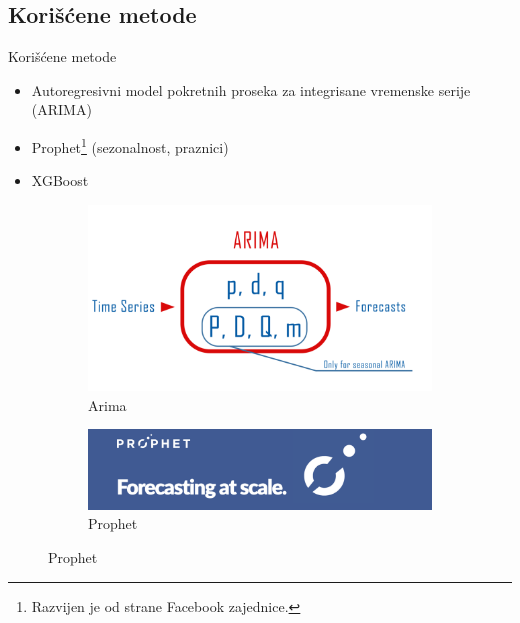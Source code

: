 \documentclass{beamer}
\begin{document}
\subsection{Korišćene metode}
\begin{frame}{Korišćene metode}
\begin{itemize}
    \item Autoregresivni model pokretnih proseka za integrisane vremenske serije (ARIMA)
    
    \item Prophet\footnote{Razvijen je od strane Facebook zajednice.} (sezonalnost, praznici)
    \item XGBoost
\end{itemize}

\begin{figure}[!tbp]
  \begin{subfigure}[b]{0.4\textwidth}
    \includegraphics[width=\textwidth]{images/arima_schema.png}
    \caption{\tiny{Arima}} 
    \label{fig:arima}
  \end{subfigure}
  \hspace{50pt}
  \begin{subfigure}[b]{0.4\textwidth}
    \includegraphics[width=\textwidth]{images/prophet_logo.png}
    \caption{\tiny {Prophet}}
    \label{fig:prophet}
  \end{subfigure}
\end{figure}

\end{frame}
\end{document}
